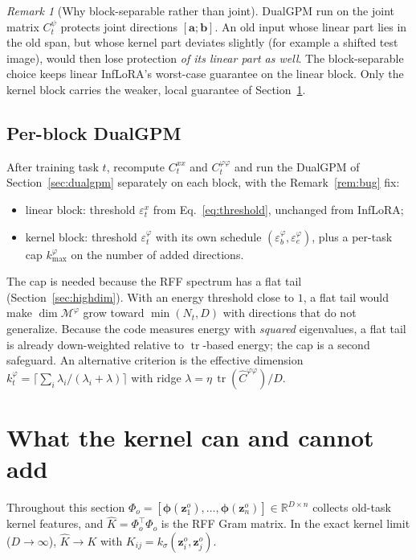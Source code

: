 \documentclass[11pt]{article}
\theoremstyle{plain}
\theoremstyle{definition}
\theoremstyle{remark}
\newtheorem{remark}{Remark}
\newcommand{\R}{\mathbb{R}}
\newcommand{\M}{\mathcal{M}}
\newcommand{\tr}{\operatorname{tr}}
\newcommand{\z}{\bm{z}}
\newcommand{\vphi}{\bm{\phi}}
\begin{document}
\begin{remark}[Why block-separable rather than joint]
DualGPM run on the joint matrix $C^\psi_t$ protects joint directions $[\bm a;\bm b]$. An old input whose linear part lies in the old span, but whose kernel part deviates slightly (for example a shifted test image), would then lose protection \emph{of its linear part as well}. The block-separable choice keeps linear InfLoRA's worst-case guarantee on the linear block. Only the kernel block carries the weaker, local guarantee of Section~\ref{sec:theory}.
\end{remark}

\subsection{Per-block DualGPM}\label{sec:blockgpm}
After training task $t$, recompute $C^{xx}_t$ and $C^{\varphi\varphi}_t$ and run the DualGPM of Section~\ref{sec:dualgpm} separately on each block, with the Remark~\ref{rem:bug} fix:
\begin{itemize}[nosep]
\item linear block: threshold $\varepsilon^x_t$ from Eq.~\eqref{eq:threshold}, unchanged from InfLoRA;
\item kernel block: threshold $\varepsilon^\varphi_t$ with its own schedule $(\varepsilon^\varphi_b,\varepsilon^\varphi_e)$, plus a per-task cap $k^\varphi_{\max}$ on the number of added directions.
\end{itemize}
The cap is needed because the RFF spectrum has a flat tail (Section~\ref{sec:highdim}). With an energy threshold close to $1$, a flat tail would make $\dim\M^\varphi$ grow toward $\min(N_t,D)$ with directions that do not generalize. Because the code measures energy with \emph{squared} eigenvalues, a flat tail is already down-weighted relative to $\tr$-based energy; the cap is a second safeguard. An alternative criterion is the effective dimension
$k^\varphi_t=\big\lceil\sum_i\lambda_i/(\lambda_i+\lambda)\big\rceil$ with ridge $\lambda=\eta\,\tr(\widehat C^{\varphi\varphi})/D$.

\section{What the kernel can and cannot add}\label{sec:theory}

Throughout this section $\Phi_o=[\vphi(\z^o_1),\dots,\vphi(\z^o_n)]\in\R^{D\times n}$ collects old-task kernel features, and $\widehat K=\Phi_o^{\top}\Phi_o$ is the RFF Gram matrix. In the exact kernel limit ($D\to\infty$), $\widehat K\to K$ with $K_{ij}=k_\sigma(\z^o_i,\z^o_j)$.
\end{document}
